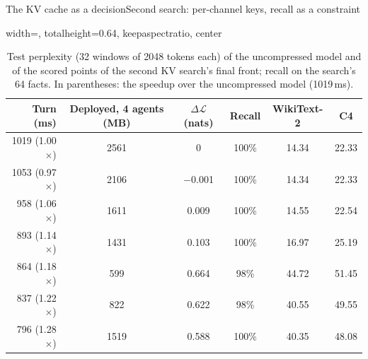 \documentclass[aspectratio=169,10pt]{beamer}
\newcommand{\dloss}{\Delta\mathcal{L}}
\begin{document}
\begin{frame}{The KV cache as a decision}{Second search: per-channel keys, recall as a constraint}
\begin{table}
\centering
\begin{adjustbox}{width=\linewidth, totalheight=0.64\textheight, keepaspectratio, center}
\centering
\small
\begin{tabular}{rccccc}
\toprule
Turn (ms) & Deployed, 4 agents (MB) & $\dloss$ (nats) & Recall & WikiText-2 & C4 \\
\midrule
 1019 (1.00$\times$) & 2561 & 0       & 100\% & 14.34 & 22.33 \\
\midrule
 1053 (0.97$\times$) & 2106 & $-$0.001 & 100\% & 14.34 & 22.33 \\
 958 (1.06$\times$) & 1611 & 0.009   & 100\% & 14.55 & 22.54 \\
 893 (1.14$\times$) & 1431 & 0.103   & 100\% & 16.97 & 25.19 \\
 864 (1.18$\times$) &  599 & 0.664   & 98\%  & 44.72 & 51.45 \\
 837 (1.22$\times$) &  822 & 0.622   & 98\%  & 40.55 & 49.55 \\
 796 (1.28$\times$) & 1519 & 0.588   & 100\% & 40.35 & 48.08 \\
\bottomrule
\end{tabular}
\end{adjustbox}
\caption{Test perplexity (32 windows of 2048 tokens each) of the uncompressed model and of the scored points
of the second KV search's final front; recall on the search's 64 facts. In parentheses: the speedup over the uncompressed model (1019\,ms).}\label{tab:kv2-test}
\end{table}
\end{frame}
\end{document}
